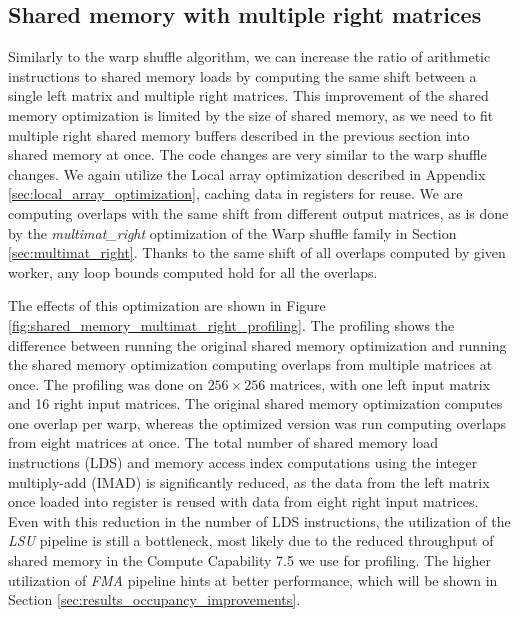 \subsection{Shared memory with multiple right matrices}
\label{sec:warp_per_shift_shared_mem_multiright}

Similarly to the warp shuffle algorithm, we can increase the ratio of arithmetic instructions to shared memory loads by computing the same shift between a single left matrix and multiple right matrices. This improvement of the shared memory optimization is limited by the size of shared memory, as we need to fit multiple right shared memory buffers described in the previous section into shared memory at once. The code changes are very similar to the warp shuffle changes. We
again utilize the Local array optimization described in Appendix \ref{sec:local_array_optimization}, caching data in registers for reuse. We are computing overlaps with the same shift from different output matrices, as is done by the \textit{multimat\_right} optimization of the Warp shuffle family in Section \ref{sec:multimat_right}. Thanks to the same shift of all overlaps computed by given worker, any loop bounds computed hold for all the overlaps.


The effects of this optimization are shown in Figure \ref{fig:shared_memory_multimat_right_profiling}. The profiling shows the difference between running the original shared memory optimization and running the shared memory optimization computing overlaps from multiple matrices at once. The profiling was done on $256 \times 256$ matrices, with one left input matrix and 16 right input matrices. The original shared memory optimization computes one overlap per warp, whereas the optimized version was run computing overlaps from eight matrices at once. The total number of shared memory load instructions (LDS) and memory access index computations using the integer multiply-add (IMAD) is significantly reduced, as the data from the left matrix once loaded into register is reused with data from eight right input matrices. Even with this reduction in the number of LDS instructions, the utilization of the \textit{LSU} pipeline is still a bottleneck, most likely due to the reduced throughput of shared memory in the Compute Capability 7.5 we use for profiling. The higher utilization of \textit{FMA} pipeline hints at better performance, which will be shown in Section \ref{sec:results_occupancy_improvements}.


